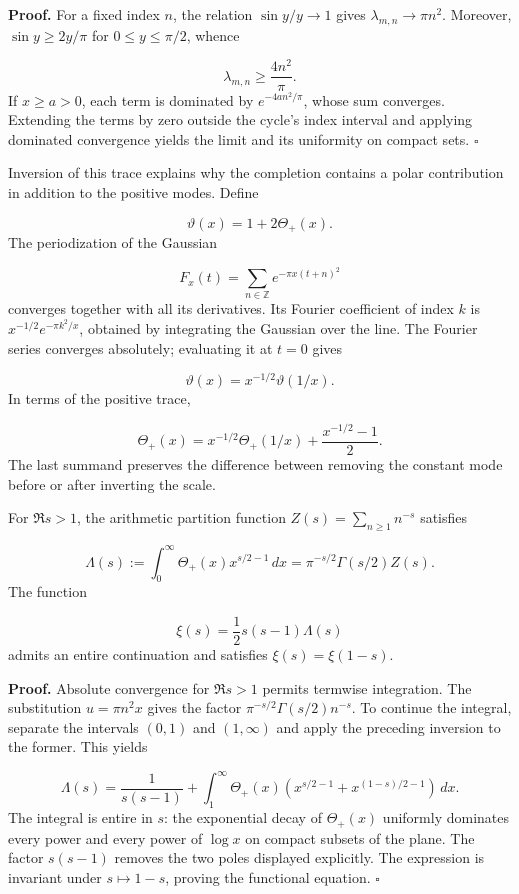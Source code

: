 \textbf{Proof.} For a fixed index \(n\), the relation \(\sin y/y\to1\) gives \(\lambda_{m,n}\to\pi n^2\). Moreover, \(\sin y\geq2y/\pi\) for \(0\leq y\leq\pi/2\), whence

\[
\lambda_{m,n}\geq\frac{4n^2}{\pi}.
\]
If \(x\geq a>0\), each term is dominated by \(e^{-4an^2/\pi}\), whose sum converges. Extending the terms by zero outside the cycle's index interval and applying dominated convergence yields the limit and its uniformity on compact sets. \hfill\(\square\)

Inversion of this trace explains why the completion contains a polar contribution in addition to the positive modes. Define

\[
\vartheta(x)=1+2\Theta_+(x).
\]
The periodization of the Gaussian

\[
F_x(t)=\sum_{n\in\mathbb Z}e^{-\pi x(t+n)^2}
\]
converges together with all its derivatives. Its Fourier coefficient of index \(k\) is \(x^{-1/2}e^{-\pi k^2/x}\), obtained by integrating the Gaussian over the line. The Fourier series converges absolutely; evaluating it at \(t=0\) gives

\[
\vartheta(x)=x^{-1/2}\vartheta(1/x).
\]
In terms of the positive trace,

\[
\Theta_+(x)=x^{-1/2}\Theta_+(1/x)+\frac{x^{-1/2}-1}{2}.
\]
The last summand preserves the difference between removing the constant mode before or after inverting the scale.

For \(\Re s>1\), the arithmetic partition function \(Z(s)=\sum_{n\geq1}n^{-s}\) satisfies

\[
\Lambda(s):=\int_0^\infty\Theta_+(x)x^{s/2-1}\,dx
=\pi^{-s/2}\Gamma(s/2)Z(s).
\]
The function

\[
\xi(s)=\frac12s(s-1)\Lambda(s)
\]
admits an entire continuation and satisfies \(\xi(s)=\xi(1-s)\).

\textbf{Proof.} Absolute convergence for \(\Re s>1\) permits termwise integration. The substitution \(u=\pi n^2x\) gives the factor \(\pi^{-s/2}\Gamma(s/2)n^{-s}\). To continue the integral, separate the intervals \((0,1)\) and \((1,\infty)\) and apply the preceding inversion to the former. This yields

\[
\Lambda(s)=\frac1{s(s-1)}
+\int_1^\infty\Theta_+(x)
\left(x^{s/2-1}+x^{(1-s)/2-1}\right)\,dx.
\]
The integral is entire in \(s\): the exponential decay of \(\Theta_+(x)\) uniformly dominates every power and every power of \(\log x\) on compact subsets of the plane. The factor \(s(s-1)\) removes the two poles displayed explicitly. The expression is invariant under \(s\mapsto1-s\), proving the functional equation. \hfill\(\square\)

